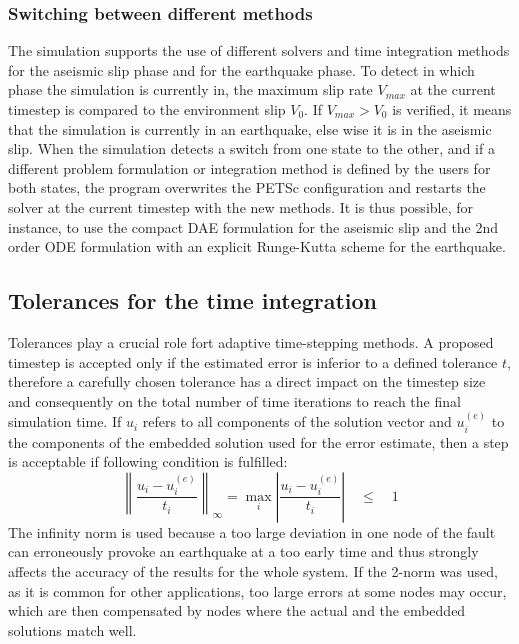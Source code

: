 \subsubsection{Switching between different methods}
The simulation supports the use of different solvers and time integration methods for the aseismic slip phase and for the earthquake phase. To detect in which phase the simulation is currently in, the maximum slip rate $V_{max}$ at the current timestep is compared to the environment slip $V_0$. If $V_{max}>V_0$ is verified, it means that the simulation is currently in an earthquake, else wise it is in the aseismic slip. When the simulation detects a switch from one state to the other, and if a different problem formulation or integration method is defined by the users for both states, the program overwrites the PETSc configuration and restarts the solver at the current timestep with the new methods. It is thus possible, for instance, to use the compact DAE formulation for the aseismic slip and the 2nd order ODE formulation with an explicit Runge-Kutta scheme for the earthquake. 

\subsection{Tolerances for the time integration}
Tolerances play a crucial role fort adaptive time-stepping methods. A proposed timestep is accepted only if the estimated error is inferior to a defined tolerance $t$, therefore a carefully chosen tolerance has a direct impact on the timestep size and consequently on the total number of time iterations to reach the final simulation time. If $u_i$ refers to all components of the solution vector and $u_i^{(e)}$ to the components of the embedded solution used for the error estimate, then a step is acceptable if following condition is fulfilled: 
\begin{equation}
\left\|\frac{u_i - u_i^{(e)}}{t_i}\right\|_\infty = \max_i \left|\frac{u_i - u_i^{(e)}}{t_i}\right|
\quad \leq \quad 1
\end{equation}
The infinity norm is used because a too large deviation in one node of the fault can erroneously provoke an earthquake at a too early time and thus strongly affects the accuracy of the results for the whole system. If the 2-norm was used, as it is common for other applications, too large errors at some nodes may occur, which are then compensated by nodes where the actual and the embedded solutions match well. \\

